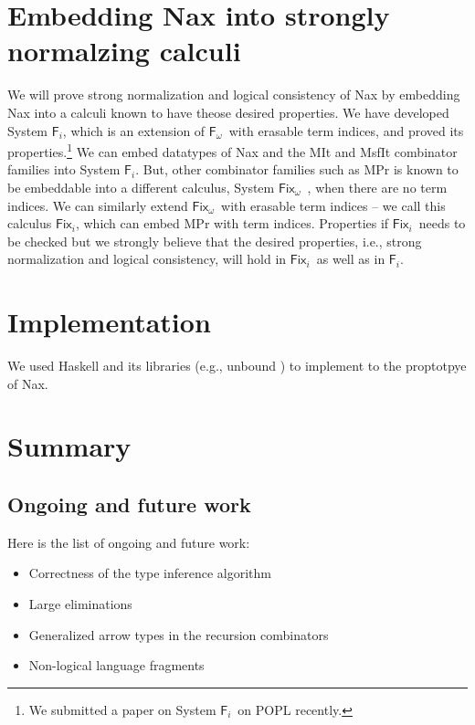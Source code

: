 \documentclass{llncs}
\newcommand{\ie}{{i.e.}}
\newcommand{\eg}{{e.g.}}
\newcommand{\Fi}{\ensuremath{\mathsf{F}_i}}
\newcommand{\Fw}{\ensuremath{\mathsf{F}_\omega}}
\newcommand{\Fix}{\mathsf{Fix}}
\newcommand{\Fixw}{\ensuremath{\Fix_{\omega}}}
\newcommand{\Fixi}{\ensuremath{\Fix_{i}}}
\begin{document}
\section{Embedding Nax into strongly normalzing calculi}
We will prove strong normalization and logical consistency of Nax
by embedding Nax into a calculi known to have theose desired properties.
We have developed System \Fi, which is an extension of \Fw\ with 
erasable term indices, and proved its properties.\footnote{
	We submitted a paper on System \Fi\ on POPL recently.}
We can embed datatypes of Nax and the \textsf{MIt} and \textsf{MsfIt}
combinator families into System \Fi. But, other combinator families
such as \textsf{MPr} is known to be embeddable into a different
calculus, System \Fixw\ \cite{AbeMat04}, when there are no term indices.
We can similarly extend \Fixw\ with erasable term indices -- we call this
calculus \Fixi, which can embed \textsf{MPr} with term indices.
Properties if \Fixi\ needs to be checked but we strongly believe
that the desired properties, \ie, strong normalization
and logical consistency, will hold in \Fixi\ as well as in \Fi.

\section{Implementation}
We used Haskell and its libraries (\eg, unbound \cite{unbound})
to implement to the proptotpye of Nax.

\section{Summary}

\subsection{Ongoing and future work}
Here is the list of ongoing and future work:
\begin{itemize}
\item Correctness of the type inference algorithm
\item Large eliminations
\item Generalized arrow types in the recursion combinators
\item Non-logical language fragments
\end{itemize}



\end{document}

